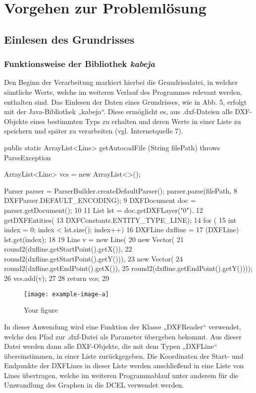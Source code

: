 \chapter{Vorgehen zur Problemlösung}
\section{Einlesen des Grundrisses}
\subsection{Funktionsweise der Bibliothek \textit{kabeja}}
Den Beginn der Verarbeitung markiert hierbei die Grundrissdatei, in welcher sämtliche Werte, welche im weiteren Verlauf des Programmes relevant werden, enthalten sind.
Das Einlesen der Daten eines Grundrisses, wie in Abb. 5, erfolgt mit der Java-Bibliothek „kabeja“. 
Diese ermöglicht es, aus .dxf-Dateien alle DXF-Objekte eines bestimmten Typs zu erhalten und deren Werte in einer Liste zu speichern und später zu verarbeiten (vgl. Internetquelle 7).
\begin{code}
	public static ArrayList<Line> getAutocadFile
	(String filePath) throws ParseException {
			ArrayList<Line> vcs = new ArrayList<>();
		
			Parser parser =
				ParserBuilder.createDefaultParser();
			parser.parse(filePath,
		8	 		DXFParser.DEFAULT_ENCODING);
		9		DXFDocument doc = parser.getDocument();
		10	
		11		List lst = doc.getDXFLayer("0").
		12	 	 	getDXFEntities(
		13	 		DXFConstants.ENTITY_TYPE_LINE); 
		14		for (
		15	 	int index = 0; index < lst.size(); index++) {
			16			DXFLine dxfline =
			17	 		(DXFLine) lst.get(index);
			18	
			19	 		Line v = new Line(
			20			new Vector(
			21	 		round2(dxfline.getStartPoint().getX()), 
			22	 		round2(dxfline.getStartPoint().getY())),
			23			new Vector(
			24	 		round2(dxfline.getEndPoint().getX()), 
			25	 		round2(dxfline.getEndPoint().getY())));
			26			vcs.add(v);
			27		}
		28		return vcs;
		29	}

\end{code}

\begin{figure}
	\centering
	\texttt{[image: example-image-a]}
	\caption{Your figure}
\end{figure}


In dieser Anwendung wird eine Funktion der Klasse „DXFReader“ verwendet, welche den Pfad zur .dxf-Datei als Parameter übergeben bekommt. 
Aus dieser Datei werden dann alle DXF-Objekte, die mit dem Typen „DXFLine“ übereinstimmen, in einer Liste zurückgegeben. 
Die Koordinaten der Start- und Endpunkte der DXFLines  in dieser Liste werden anschließend in eine Liste von Lines übertragen, welche im weiteren Programmablauf unter anderem für die Umwandlung des Graphen in die DCEL verwendet werden.
